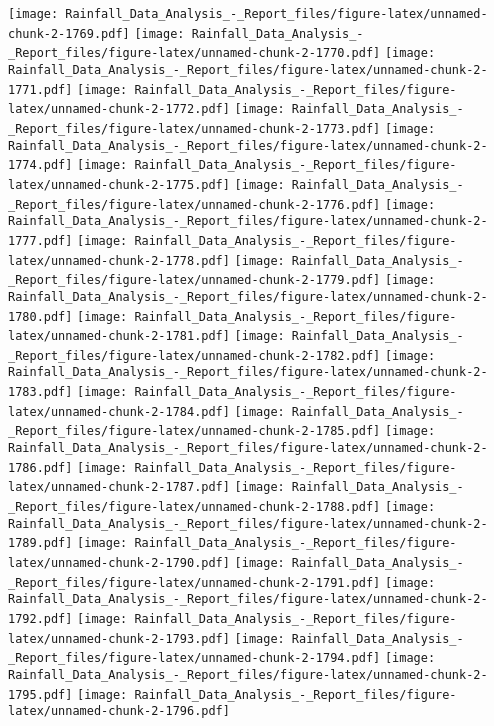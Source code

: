 \documentclass[
]{article}
\begin{document}
\texttt{[image: Rainfall\_Data\_Analysis\_-\_Report\_files/figure-latex/unnamed-chunk-2-1769.pdf]}
\texttt{[image: Rainfall\_Data\_Analysis\_-\_Report\_files/figure-latex/unnamed-chunk-2-1770.pdf]}
\texttt{[image: Rainfall\_Data\_Analysis\_-\_Report\_files/figure-latex/unnamed-chunk-2-1771.pdf]}
\texttt{[image: Rainfall\_Data\_Analysis\_-\_Report\_files/figure-latex/unnamed-chunk-2-1772.pdf]}
\texttt{[image: Rainfall\_Data\_Analysis\_-\_Report\_files/figure-latex/unnamed-chunk-2-1773.pdf]}
\texttt{[image: Rainfall\_Data\_Analysis\_-\_Report\_files/figure-latex/unnamed-chunk-2-1774.pdf]}
\texttt{[image: Rainfall\_Data\_Analysis\_-\_Report\_files/figure-latex/unnamed-chunk-2-1775.pdf]}
\texttt{[image: Rainfall\_Data\_Analysis\_-\_Report\_files/figure-latex/unnamed-chunk-2-1776.pdf]}
\texttt{[image: Rainfall\_Data\_Analysis\_-\_Report\_files/figure-latex/unnamed-chunk-2-1777.pdf]}
\texttt{[image: Rainfall\_Data\_Analysis\_-\_Report\_files/figure-latex/unnamed-chunk-2-1778.pdf]}
\texttt{[image: Rainfall\_Data\_Analysis\_-\_Report\_files/figure-latex/unnamed-chunk-2-1779.pdf]}
\texttt{[image: Rainfall\_Data\_Analysis\_-\_Report\_files/figure-latex/unnamed-chunk-2-1780.pdf]}
\texttt{[image: Rainfall\_Data\_Analysis\_-\_Report\_files/figure-latex/unnamed-chunk-2-1781.pdf]}
\texttt{[image: Rainfall\_Data\_Analysis\_-\_Report\_files/figure-latex/unnamed-chunk-2-1782.pdf]}
\texttt{[image: Rainfall\_Data\_Analysis\_-\_Report\_files/figure-latex/unnamed-chunk-2-1783.pdf]}
\texttt{[image: Rainfall\_Data\_Analysis\_-\_Report\_files/figure-latex/unnamed-chunk-2-1784.pdf]}
\texttt{[image: Rainfall\_Data\_Analysis\_-\_Report\_files/figure-latex/unnamed-chunk-2-1785.pdf]}
\texttt{[image: Rainfall\_Data\_Analysis\_-\_Report\_files/figure-latex/unnamed-chunk-2-1786.pdf]}
\texttt{[image: Rainfall\_Data\_Analysis\_-\_Report\_files/figure-latex/unnamed-chunk-2-1787.pdf]}
\texttt{[image: Rainfall\_Data\_Analysis\_-\_Report\_files/figure-latex/unnamed-chunk-2-1788.pdf]}
\texttt{[image: Rainfall\_Data\_Analysis\_-\_Report\_files/figure-latex/unnamed-chunk-2-1789.pdf]}
\texttt{[image: Rainfall\_Data\_Analysis\_-\_Report\_files/figure-latex/unnamed-chunk-2-1790.pdf]}
\texttt{[image: Rainfall\_Data\_Analysis\_-\_Report\_files/figure-latex/unnamed-chunk-2-1791.pdf]}
\texttt{[image: Rainfall\_Data\_Analysis\_-\_Report\_files/figure-latex/unnamed-chunk-2-1792.pdf]}
\texttt{[image: Rainfall\_Data\_Analysis\_-\_Report\_files/figure-latex/unnamed-chunk-2-1793.pdf]}
\texttt{[image: Rainfall\_Data\_Analysis\_-\_Report\_files/figure-latex/unnamed-chunk-2-1794.pdf]}
\texttt{[image: Rainfall\_Data\_Analysis\_-\_Report\_files/figure-latex/unnamed-chunk-2-1795.pdf]}
\texttt{[image: Rainfall\_Data\_Analysis\_-\_Report\_files/figure-latex/unnamed-chunk-2-1796.pdf]}
\end{document}

